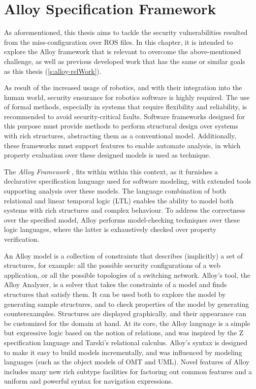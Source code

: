 \chapter{Alloy Specification Framework}\label{c:alloy}

As aforementioned, this thesis aims to tackle the security vulnerabilities resulted from the miss-configuration over ROS files. In this chapter, it is intended to explore the Alloy framework that is relevant to overcome the above-mentioned challenge, as well as previous developed work that has the same or similar goals as this thesis (\ref{s:alloy-relWork}).

As result of the increased usage of robotics, and with their integration into the human world, security ensurance for robotics software is highly required. The use of formal methods, especially in systems that require flexibility and reliability, is recommended to avoid security-critical faults. \cite{carvalho2020analysis} Software frameworks designed for this purpose must provide methods to perform structural design over systems with rich structures, abstracting them as a conventional model. Additionally, these frameworks must support features to enable automate analysis, in which property evaluation over these designed models is used as technique. 

The \textit{Alloy Framework} \cite{alloy-DJ}, fits within within this context, as it furnishes a declarative specification language used for software modeling, with extended tools supporting analysis over these models. \cite{alloy-6} The language combination of both relational and linear temporal logic (LTL) enables the ability to model both systems with rich structures and complex behaviour. To address the correctness over the specified model, Alloy performs model-checking techniques over these logic languages, where the latter is exhaustively checked over property verification. \cite{lwspecification, carvalho2020analysis}

An Alloy model is a collection of constraints that describes (implicitly) a set of structures, for example: all the possible security configurations of a web application, or all the possible topologies of a switching network. Alloy’s tool, the Alloy Analyzer, is a solver that takes the constraints of a model and finds structures that satisfy them. It can be used both to explore the model by generating sample structures, and to check properties of the model by generating counterexamples. Structures are displayed graphically, and their appearance can be customized for the domain at hand.
At its core, the Alloy language is a simple but expressive logic based on the notion of relations, and was inspired by the Z specification language and Tarski’s relational calculus. Alloy’s syntax is designed to make it easy to build models incrementally, and was influenced by modeling languages (such as the object models of OMT and UML). Novel features of Alloy includes many new rich subtype facilities for factoring out common features and a uniform and powerful syntax for navigation expressions.

